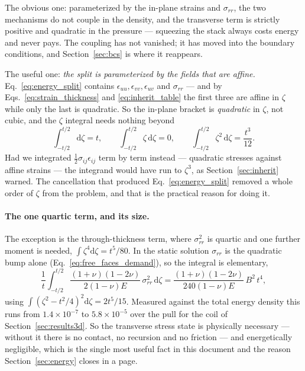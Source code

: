\documentclass[11pt]{article}
\begin{document}
The obvious one: parameterized by the in-plane strains and $\sigma_{rr}$, the two
mechanisms do not couple in the density, and the transverse term is strictly
positive and quadratic in the pressure --- squeezing the stack always costs
energy and never pays. The coupling has not vanished; it has moved into the
boundary conditions, and Section~\ref{sec:bcs} is where it reappears.

The useful one: \emph{the split is parameterized by the fields that are affine.}
Eq.~\eqref{eq:energy_split} contains $\epsilon_{uu}, \epsilon_{vv},
\epsilon_{uv}$ and $\sigma_{rr}$ --- and by
Eqs.~\eqref{eq:strain_thickness} and \eqref{eq:inherit_table} the first three are
affine in $\zeta$ while only the last is quadratic. So the in-plane bracket is
\emph{quadratic} in $\zeta$, not cubic, and the $\zeta$ integral needs nothing
beyond
\begin{equation}\label{eq:zeta_moments_energy}
    \int_{-t/2}^{t/2}\mathrm d\zeta = t,
    \qquad
    \int_{-t/2}^{t/2}\zeta\,\mathrm d\zeta = 0,
    \qquad
    \int_{-t/2}^{t/2}\zeta^{2}\,\mathrm d\zeta = \frac{t^{3}}{12}.
\end{equation}
Had we integrated $\tfrac12\sigma_{ij}\epsilon_{ij}$ term by term instead ---
quadratic stresses against affine strains --- the integrand would have run to
$\zeta^{3}$, as Section~\ref{sec:inherit} warned. The cancellation that produced
Eq.~\eqref{eq:energy_split} removed a whole order of $\zeta$ from the problem,
and that is the practical reason for doing it.

\paragraph{The one quartic term, and its size.} The exception is the
through-thickness term, where $\sigma_{rr}^{2}$ is quartic and one further moment
is needed, $\int\zeta^{4}\mathrm d\zeta = t^{5}/80$. In the static solution
$\sigma_{rr}$ is the quadratic bump alone
(Eq.~\ref{eq:free_faces_demand}), so the integral is elementary,
\begin{equation}\label{eq:U_rr}
    \frac{1}{t}\int_{-t/2}^{t/2}
      \frac{\left(1+\nu\right)\left(1-2\nu\right)}{2\left(1-\nu\right)E}\,
      \sigma_{rr}^{2}\,\mathrm d\zeta
    = \frac{\left(1+\nu\right)\left(1-2\nu\right)}{240\left(1-\nu\right)E}\,
      B^{2}\,t^{4},
\end{equation}
using $\int\left(\zeta^{2}-t^{2}/4\right)^{2}\mathrm d\zeta = 2t^{5}/15$. Measured
against the total energy density this runs from $1.4\times10^{-7}$ to
$5.8\times10^{-5}$ over the pull for the coil of
Section~\ref{sec:results3d}. So the transverse stress state is physically
necessary --- without it there is no contact, no recursion and no friction --- and
energetically negligible, which is the single most useful fact in this document
and the reason Section~\ref{sec:energy} closes in a page.
\end{document}
